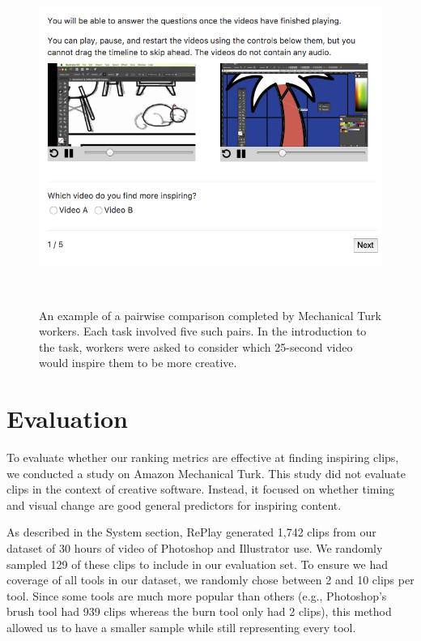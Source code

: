 \begin{figure}[b!]
\centering
  \includegraphics[width=\columnwidth]{liveclips/figures/mturk.png}
  \caption{An example of a pairwise comparison completed by Mechanical Turk workers. Each task involved five such pairs. In the introduction to the task, workers were asked to consider which 25-second video would inspire them to be more creative. }~\label{fig:liveclips_mturk}
\end{figure}

\section{Evaluation}
To evaluate whether our ranking metrics are effective at finding inspiring clips, we conducted a study on Amazon Mechanical Turk. This study did not evaluate clips in the context of creative software. Instead, it focused on whether timing and visual change are good general predictors for inspiring content. 

As described in the System section, RePlay generated 1,742 clips from our dataset of 30 hours of video of Photoshop and Illustrator use. We randomly sampled 129 of these clips to include in our evaluation set. To ensure we had coverage of all tools in our dataset, we randomly chose between 2 and 10 clips per tool. Since some tools are much more popular than others (e.g., Photoshop's brush tool had 939 clips whereas the burn tool only had 2 clips), this method allowed us to have a smaller sample while still representing every tool.

